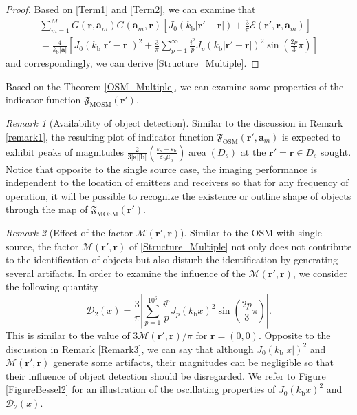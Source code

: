 \documentclass[3p,10pt]{elsarticle}
\newcommand{\eps}{\varepsilon}
\newcommand{\kb}{k_{\mathrm{b}}}
\newcommand{\epsb}{\varepsilon_{\mathrm{b}}}
\newcommand{\mub}{\mu_{\mathrm{b}}}
\newcommand{\ma}{\mathbf{a}}
\newcommand{\mb}{\mathbf{b}}
\newcommand{\mr}{\mathbf{r}}
\DeclareMathOperator*{\osm}{OSM}
\DeclareMathOperator*{\mosm}{MOSM}
\DeclareMathOperator*{\area}{area}
\theoremstyle{plain}
\theoremstyle{remark}
\newtheorem{remark}{Remark}[section]
\begin{document}
\begin{proof}
Based on \eqref{Term1} and \eqref{Term2}, we can examine that
\begin{multline*}
\sum_{m=1}^{M}G(\mr,\ma_m)\overline{G(\ma_m,\mr)}\left[J_0(\kb|\mr'-\mr|)+\frac{3}{\pi}\mathcal{E}(\mr',\mr,\ma_m)\right]\\=\frac{4}{\kb|\ma|}\left[J_0(\kb|\mr'-\mr|)^2+\frac{3}{\pi}\sum_{p=1}^{\infty}\frac{i^p}{p}J_p(\kb|\mr'-\mr|)^2\sin\left(\frac{2p}{3}\pi\right)\right]
\end{multline*}
and correspondingly, we can derive \eqref{Structure_Multiple}.
\end{proof}

Based on the Theorem \ref{OSM_Multiple}, we can examine some properties of the indicator function $\mathfrak{F}_{\mosm}(\mr')$.

\begin{remark}[Availability of object detection]\label{RemarkM1}
Similar to the discussion in Remark \ref{remark1}, the resulting plot of indicator function $\mathfrak{F}_{\osm}(\mr',\ma_m)$ is expected to exhibit peaks of magnitudes $\frac{2}{3|\ma||\mb|}\left(\frac{\eps_s-\epsb}{\epsb\mub}\right)\area(D_s)$ at the $\mr'=\mr\in D_s$ sought. Notice that opposite to the single source case, the imaging performance is independent to the location of emitters and receivers so that for any frequency of operation, it will be possible to recognize the existence or outline shape of objects through the map of $\mathfrak{F}_{\mosm}(\mr')$.
\end{remark}

\begin{remark}[Effect of the factor $\mathcal{M}(\mr',\mr)$]\label{RemarkM2}
Similar to the OSM with single source, the factor $\mathcal{M}(\mr',\mr)$ of \eqref{Structure_Multiple} not only does not contribute to the identification of objects but also disturb the identification by generating several artifacts. In order to examine the influence of the $\mathcal{M}(\mr',\mr)$, we consider the following quantity
\[\mathcal{D}_2(x)=\frac{3}{\pi}\left|\sum_{p=1}^{10^6}\frac{i^p}{p}J_p(\kb x)^2\sin\left(\frac{2p}{3}\pi\right)\right|.\]
This is similar to the value of $3\mathcal{M}(\mr',\mr)/\pi$ for $\mr=(0,0)$. Opposite to the discussion in Remark \ref{Remark3}, we can say that although $J_0(\kb|x|)^2$ and $\mathcal{M}(\mr',\mr)$ generate some artifacts, their magnitudes can be negligible so that their influence of object detection should be disregarded. We refer to Figure \ref{FigureBessel2} for an illustration of the oscillating properties of $J_0(\kb x)^2$ and $\mathcal{D}_2(x)$.
\end{remark}
\end{document}
